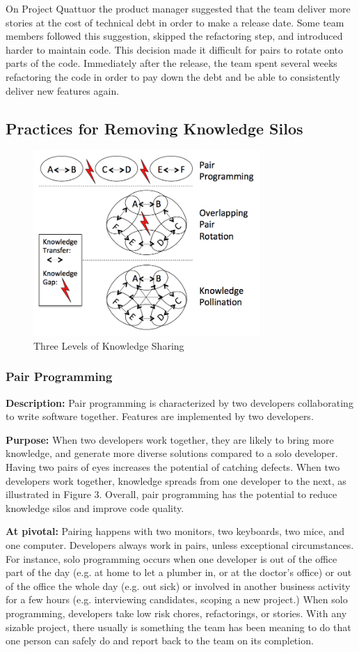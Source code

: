 \begin{table}[]
On Project Quattuor the product manager suggested that the team deliver more stories at the cost of technical debt in order to make a release date. Some team members followed this suggestion, skipped the refactoring step, and introduced harder to maintain code. This decision made it difficult for pairs to rotate onto parts of the code. Immediately after the release, the team spent several weeks refactoring the code in order to pay down the debt and be able to consistently deliver new features again.  
\subsection{Practices for Removing Knowledge Silos}
\begin{figure}[t]
\centering
\includegraphics[width=3.4in]{KnowledgeSharingLevels.png}
\caption{Three Levels of Knowledge Sharing}
\label{KnowledgeSharing}
\end{figure}

\subsubsection{Pair Programming}
\textbf{Description:} Pair programming is characterized by two developers collaborating to write software together. Features are implemented by two developers.

\textbf{Purpose:} When two developers work together, they are likely to bring more knowledge, and generate more diverse solutions compared to a solo developer. Having two pairs of eyes increases the potential of catching defects. When two developers work together, knowledge spreads from one developer to the next, as illustrated in Figure 3. Overall, pair programming has the potential to reduce knowledge silos and improve code quality.

\textbf{At pivotal:} Pairing happens with two monitors, two keyboards, two mice, and one computer. Developers always work in pairs, unless exceptional circumstances. For instance, solo programming occurs when one developer is out of the office part of the day (e.g. at home to let a plumber in, or at the doctor's office) or out of the office the whole day (e.g. out sick) or involved in another business activity for a few hours (e.g. interviewing candidates, scoping a new project.) When solo programming, developers take low risk chores, refactorings, or stories. With any sizable project, there usually is something the team has been meaning to do that one person can safely do and report back to the team on its completion.  


\end{table}
